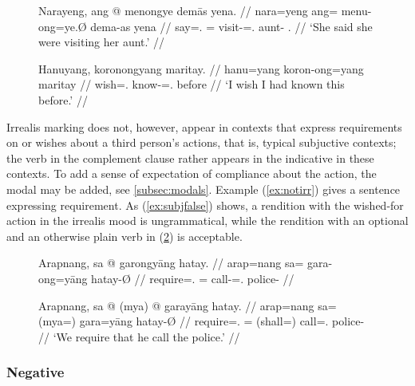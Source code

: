 \begin{figure}[h]
\pex
\a\label{ex:irrrepspch}\begingl
	\gla Narayeng, ang @ menongye demās yena. //
	\glb nara=yeng ang= menu-ong=ye.Ø dema-as yena //
	\glc say=\TsgF{}.\Aarg{} \AgtT{}= visit-\Irr{}=\TsgF{}.\Top{} 
		aunt-\Parg{} \TsgF{}.\Gen{} //
	\glft `She said she were visiting her aunt.' //
\endgl

\a\label{ex:irrwish}\begingl
	\gla Hanuyang, koronongyang maritay. //
	\glb hanu=yang koron-ong=yang maritay //
	\glc wish=\Fsg{}.\Aarg{} know-\Irr{}=\Fsg{}.\Aarg{} before //
	\glft `I wish I had known this before.' //
\endgl
\xe
\end{figure}

Irrealis marking does not, however, appear in contexts that express
requirements on or wishes about a third person's actions, that is, typical
subjuctive contexts; the verb in the complement clause rather appears in the
indicative in these contexts. To add a sense of expectation of compliance about
the action, the modal  may be added, see
\autoref{subsec:modals}. Example (\ref{ex:notirr}) gives a sentence expressing
requirement. As (\ref{ex:subjfalse}) shows, a rendition with the wished-for
action in the irrealis mood is ungrammatical, while the rendition with an
optional  and an otherwise plain verb in (\ref{ex:myashall}) is
acceptable.

\begin{figure}[h]
\pex\label{ex:notirr}
\a\label{ex:subjfalse}\ljudge*\begingl
	\gla Arapnang, sa @ garongyāng hatay. //
	\glb arap=nang sa= gara-ong=yāng hatay-Ø //
	\glc require=\Fpl{}.\Aarg{} \PatT{}= call-\Irr{}=\TsgM{}.\Aarg{}
		police-\Top{} //
\endgl

\a\label{ex:myashall}\begingl
	\gla Arapnang, sa @ \textup{(}mya\textup{)} @ garayāng hatay. //
	\glb arap=nang sa= (mya=) gara=yāng hatay-Ø //
	\glc require=\Fpl{}.\Aarg{} \PatT{}= (shall=) call=\TsgM{}.\Aarg{}
		police-\Top{} //
	\glft `We require that he call the police.' //
\endgl
\xe
\end{figure}


\subsubsection{Negative}
\label{subsubsec:verbneg}

